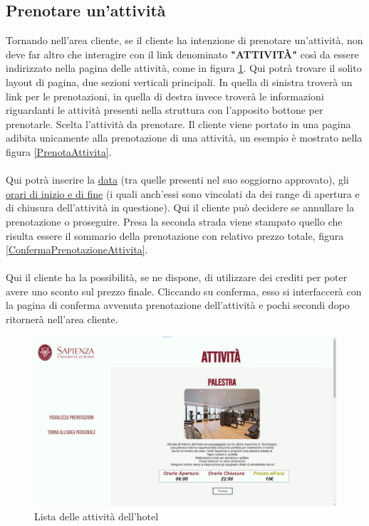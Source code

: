 \documentclass [a4paper, 12pt]{book}
\begin{document}
\subsection{Prenotare un'attività}
Tornando nell'area cliente, se il cliente ha intenzione di prenotare un'attività, non deve far altro che interagire con il link denominato \textbf{"ATTIVITÀ"} così da essere indirizzato nella pagina delle attività, come in figura \ref{ListaAttivitaCliente}. 
Qui potrà trovare il solito layout di pagina, due sezioni verticali principali. In quella di sinistra troverà un link per le prenotazioni, in quella di destra invece troverà le informazioni riguardanti le attività presenti nella struttura con l'apposito bottone per prenotarle. Scelta l'attività da prenotare. Il cliente viene portato in una pagina adibita unicamente alla prenotazione di una attività, un esempio è mostrato nella figura \ref{PrenotaAttivita}.\\\\
Qui potrà inserire la \underline{data} (tra quelle presenti nel suo soggiorno approvato), gli \underline{orari di inizio e di fine} (i quali anch'essi sono vincolati da dei range di apertura e di chiusura dell'attività in questione). Qui il cliente può decidere se annullare la prenotazione o proseguire. Presa la seconda strada viene stampato quello che risulta essere il sommario della prenotazione con relativo prezzo totale, figura \ref{ConfermaPrenotazioneAttivita}.\\\\
Qui il cliente ha la possibilità, se ne dispone, di utilizzare dei crediti per poter avere uno sconto sul prezzo finale. Cliccando su conferma, esso si interfaccerà con la pagina di conferma avvenuta prenotazione dell'attività e pochi secondi dopo ritornerà nell'area cliente.
\begin{figure}[!h]
\centering
\includegraphics[scale=0.3]{ListaAttivitaCliente.png}
\caption{Lista delle attività dell'hotel}
\label{ListaAttivitaCliente}
\end{figure}\newpage
\end{document}
